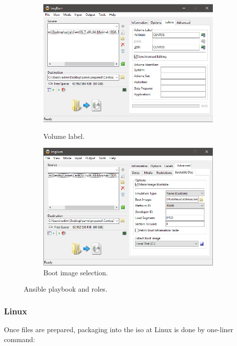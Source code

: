 \documentclass[
  printed, %
  table,   %
  lof,     %
  lot,     %
           oneside, color
]{fithesis3}
\renewcommand{\texttt}[1]{%
  \begingroup
  \ttfamily
  \begingroup\lccode`~=`/\lowercase{\endgroup\def~}{/\discretionary{}{}{}}%
  \begingroup\lccode`~=`[\lowercase{\endgroup\def~}{[\discretionary{}{}{}}%
  \begingroup\lccode`~=`.\lowercase{\endgroup\def~}{.\discretionary{}{}{}}%
  \catcode`/=\active\catcode`[=\active\catcode`.=\active
  \scantokens{#1\noexpand}%
  \endgroup
}
\begin{document}
\begin{figure}[H]
\begin{subfigure}{.5\textwidth}
\begin{center}

 \includegraphics[trim={9.1cm 3cm 0.4cm 3cm},clip,width=.8\textwidth]{Screenshot_16.png}
    \caption{Volume label.}
    \label{pic:withoutresdrawable}
 \label{fig:sub1}\end{center}
\end{subfigure}%
\begin{subfigure}{.5\textwidth}
\begin{center}

 \includegraphics[trim={9.1cm 3cm 0.4cm 3cm},clip,width=.8\textwidth]{Screenshot_17.png}
    \caption{Boot image selection.}
\end{center}
\end{subfigure}
\label{fig:test}\caption{Ansible playbook and roles.}
\end{figure}


\subsubsection{Linux}
Once files are prepared, packaging into the iso at Linux is done by one-liner command:
\end{document}
